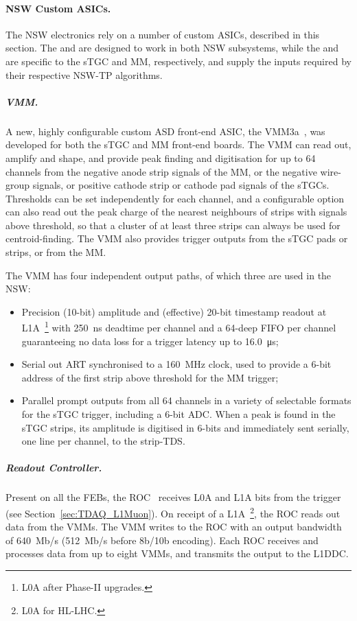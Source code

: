 \documentclass[cernpreprint, atlasdraft=false, UKenglish,british,orcidlogo, texmf, orcidlogo]{atlasdoc}
\begin{document}
\paragraph{NSW Custom ASICs.}
The \gls{NSW} electronics rely on a number of custom \glspl{ASIC}, described in this section. The  and  are designed to work in both \gls{NSW} subsystems, while the  and  are specific to the \gls{sTGC} and \gls{MM}, respectively, and supply the inputs required by their respective \gls{NSW-TP} algorithms.
 
\subparagraph{VMM.} \label{MuSP:VMM}
A new, highly configurable custom \gls{ASD} front-end \gls{ASIC}, the \gls{VMM}3a~\cite{VMMref},
was developed for both the \gls{sTGC} and \gls{MM} front-end boards.
The \gls{VMM} can read out, amplify and shape, and provide peak finding and digitisation for up to 64 channels from the negative anode strip signals of the \gls{MM}, or the negative wire-group signals, or positive cathode strip or cathode pad signals of the \glspl{sTGC}.
Thresholds can be set independently for each channel, and a configurable option can also read out the peak charge of the nearest neighbours of strips with signals above threshold, so that a cluster of at least three strips can always be used for centroid-finding.
The \gls{VMM} also provides trigger outputs from the \gls{sTGC} pads or strips, or from the \gls{MM}.
 
The \gls{VMM} has four independent output paths, of which three are used in the \gls{NSW}: 
\begin{itemize}
\item Precision (10-bit) amplitude and (effective) 20-bit timestamp readout at \gls{L1A}~\footnote{\gls{L0A} after Phase-II upgrades.} with \SI{250}{\ns} deadtime per channel and a 64-deep FIFO per channel guaranteeing no data loss for a trigger latency up to \SI{16.0}{\us}; 
\item Serial out \gls{ART} synchronised to a \SI{160}{\MHz} clock, used to provide a 6-bit address of the first strip above threshold for the \gls{MM} trigger;
\item Parallel prompt outputs from all \num{64} channels in a variety of selectable formats for the \gls{sTGC} trigger, including a 6-bit \gls{ADC}.  When a peak is found in the \gls{sTGC} strips, its amplitude is digitised in 6-bits and immediately sent serially, one line per channel, to the strip-\gls{TDS}.
\end{itemize}
 
 
\subparagraph{Readout Controller.} 
Present on all the \glspl{FEB}, the \gls{ROC}~\cite{ROC} receives \gls{L0A} and \gls{L1A} bits from the trigger (see Section~\ref{sec:TDAQ_L1Muon}).
On receipt of a \gls{L1A}~\footnote{\gls{L0A} for \gls{HL-LHC}.}, the \gls{ROC} reads out data from the \glspl{VMM}.
The \gls{VMM} writes to the \gls{ROC} with an output bandwidth of \SI{640}{Mb/\s} (\SI{512}{Mb/\s} before 8b/10b encoding).
Each \gls{ROC} receives and processes data from up to eight \glspl{VMM}, and transmits the output to the \gls{L1DDC}.
 
\end{document}
